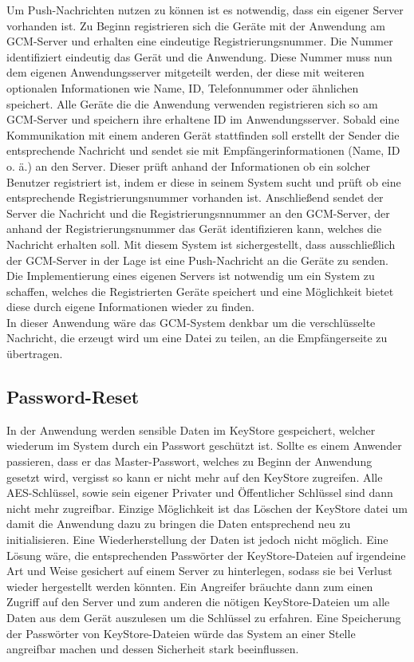 \documentclass[10pt, a4paper,headsepline]{scrreprt}
\begin{document}
Um Push-Nachrichten nutzen zu können ist es notwendig, dass ein eigener Server vorhanden ist. Zu Beginn registrieren sich die Geräte mit der Anwendung am GCM-Server und erhalten eine eindeutige Registrierungsnummer. Die Nummer identifiziert eindeutig das Gerät und die Anwendung. Diese Nummer muss nun dem eigenen Anwendungsserver mitgeteilt werden, der diese mit weiteren optionalen Informationen wie Name, ID, Telefonnummer oder ähnlichen speichert. Alle Geräte die die Anwendung verwenden registrieren sich so am GCM-Server und speichern ihre erhaltene ID im Anwendungsserver. Sobald eine Kommunikation mit einem anderen Gerät stattfinden soll erstellt der Sender die entsprechende Nachricht und sendet sie mit Empfängerinformationen (Name, ID o. ä.) an den Server. Dieser prüft anhand der Informationen ob ein solcher Benutzer registriert ist, indem er diese in seinem System sucht und prüft ob eine entsprechende Registrierungsnummer vorhanden ist. Anschließend sendet der Server die Nachricht und die Registrierungsnnummer an den GCM-Server, der anhand der Registrierungsnummer das Gerät identifizieren kann, welches die Nachricht erhalten soll. Mit diesem System ist sichergestellt, dass ausschließlich der GCM-Server in der Lage ist eine Push-Nachricht an die Geräte zu senden. Die Implementierung eines eigenen Servers ist notwendig um ein System zu schaffen, welches die Registrierten Geräte speichert und eine Möglichkeit bietet diese durch eigene Informationen wieder zu finden. \\
In dieser Anwendung wäre das GCM-System denkbar um die verschlüsselte Nachricht, die erzeugt wird um eine Datei zu teilen, an die Empfängerseite zu übertragen.


\subsection{Password-Reset}
In der Anwendung werden sensible Daten im KeyStore gespeichert, welcher wiederum im System durch ein Passwort geschützt ist. Sollte es einem Anwender passieren, dass er das Master-Passwort, welches zu Beginn der Anwendung gesetzt wird, vergisst so kann er nicht mehr auf den KeyStore zugreifen. Alle AES-Schlüssel, sowie sein eigener Privater und Öffentlicher Schlüssel sind dann nicht mehr zugreifbar. Einzige Möglichkeit ist das Löschen der KeyStore datei um damit die Anwendung dazu zu bringen die Daten entsprechend neu zu initialisieren. Eine Wiederherstellung der Daten ist jedoch nicht möglich. Eine Lösung wäre, die entsprechenden Passwörter der KeyStore-Dateien auf irgendeine Art und Weise gesichert auf einem Server zu hinterlegen, sodass sie bei Verlust wieder hergestellt werden könnten. Ein Angreifer bräuchte dann zum einen Zugriff auf den Server und zum anderen die nötigen KeyStore-Dateien um alle Daten aus dem Gerät auszulesen um die Schlüssel zu erfahren. Eine Speicherung der Passwörter von KeyStore-Dateien würde das System an einer Stelle angreifbar machen und dessen Sicherheit stark beeinflussen.
\end{document}

